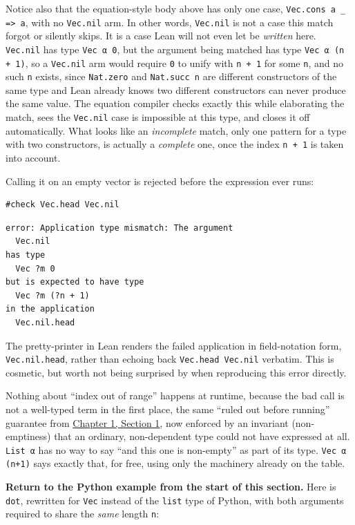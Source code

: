 Notice also that the equation-style body above has only one case, \texttt{Vec.cons a \_\allowbreak{} => a}, with no \texttt{Vec.nil} arm. In other words, \texttt{Vec.nil} is not a case this match forgot or silently skips. It is a case Lean will not even let be \emph{written} here. \texttt{Vec.nil} has type \texttt{Vec α 0}, but the argument being matched has type \texttt{Vec α (n + 1)}, so a \texttt{Vec.nil} arm would require \texttt{0} to unify with \texttt{n + 1} for some \texttt{n}, and no such \texttt{n} exists, since \texttt{Nat.zero} and \texttt{Nat.succ n} are different constructors of the same type and Lean already knows two different constructors can never produce the same value. The equation compiler checks exactly this while elaborating the match, sees the \texttt{Vec.nil} case is impossible at this type, and closes it off automatically. What looks like an \emph{incomplete} match, only one pattern for a type with two constructors, is actually a \emph{complete} one, once the index \texttt{n + 1} is taken into account.

Calling it on an empty vector is rejected before the expression ever runs:

\begin{lstlisting}
#check Vec.head Vec.nil
\end{lstlisting}

\begin{lstlisting}
error: Application type mismatch: The argument
  Vec.nil
has type
  Vec ?m 0
but is expected to have type
  Vec ?m (?n + 1)
in the application
  Vec.nil.head
\end{lstlisting}

The pretty-printer in Lean renders the failed application in field-notation form, \texttt{Vec.nil.head}, rather than echoing back \texttt{Vec.head Vec.nil} verbatim. This is cosmetic, but worth not being surprised by when reproducing this error directly.

Nothing about ``index out of range'' happens at runtime, because the bad call is not a well-typed term in the first place, the same ``ruled out before running'' guarantee from \hyperref[sec:01-basics:01-everything-has-a-type:1]{Chapter 1, Section 1}, now enforced by an invariant (non-emptiness) that an ordinary, non-dependent type could not have expressed at all. \texttt{List α} has no way to say ``and this one is non-empty'' as part of its type. \texttt{Vec α (n+1)} says exactly that, for free, using only the machinery already on the table.

\textbf{Return to the Python example from the start of this section.} Here is \texttt{dot}, rewritten for \texttt{Vec} instead of the \texttt{list} type of Python, with both arguments required to share the \emph{same} length \texttt{n}:


